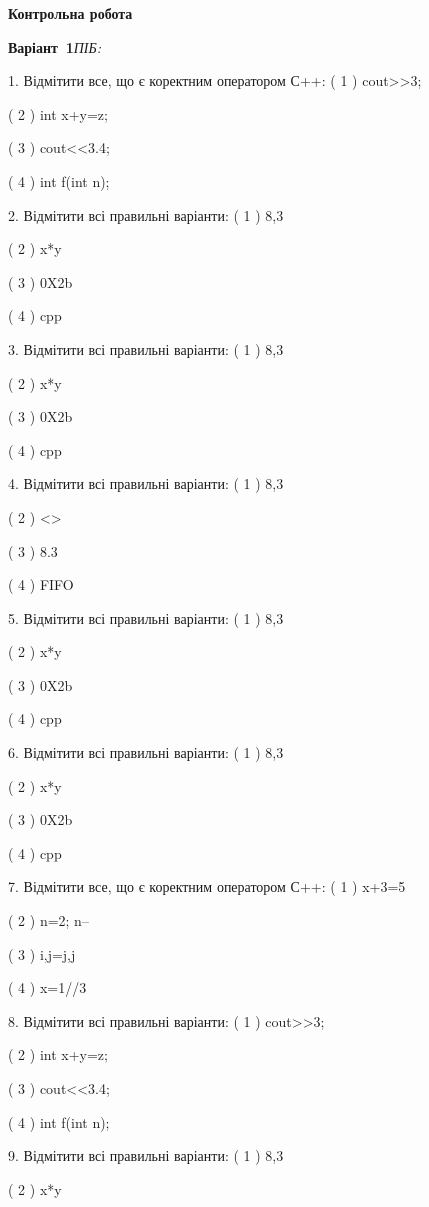 \documentclass[11pt]{article}
\begin{document}
{\large\textbf{Контрольна робота}}

\textbf{Варіант \No\,1}\hfill \textit{ПІБ:}\,\underline{\hspace{60mm}}
\vspace{4mm}

1. Відмітити все, що є коректним оператором С++:
( 1 ) cout>>3;

( 2 ) int x+y=z;

( 3 ) cout<<3.4;

( 4 ) int f(int n);

2. Відмітити всі правильні варіанти:
( 1 ) 8,3

( 2 ) x*y

( 3 ) 0X2b

( 4 ) cpp

3. Відмітити всі правильні варіанти:
( 1 ) 8,3

( 2 ) x*y

( 3 ) 0X2b

( 4 ) cpp

4. Відмітити всі правильні варіанти:
( 1 ) 8,3

( 2 ) <>

( 3 ) 8.3

( 4 ) FIFO

5. Відмітити всі правильні варіанти:
( 1 ) 8,3

( 2 ) x*y

( 3 ) 0X2b

( 4 ) cpp

6. Відмітити всі правильні варіанти:
( 1 ) 8,3

( 2 ) x*y

( 3 ) 0X2b

( 4 ) cpp

7. Відмітити все, що є коректним оператором С++:
( 1 ) x+3=5

( 2 ) n=2; n--

( 3 ) i,j=j,j

( 4 ) x=1//3

8. Відмітити всі правильні варіанти:
( 1 ) cout>>3;

( 2 ) int x+y=z;

( 3 ) cout<<3.4;

( 4 ) int f(int n);

9. Відмітити всі правильні варіанти:
( 1 ) 8,3

( 2 ) x*y
\end{document}
